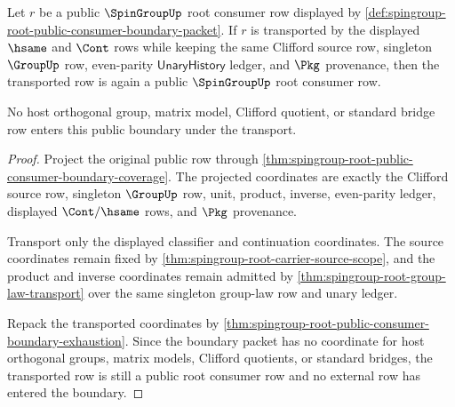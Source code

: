 \begin{theorem}
\label{thm:spingroup-root-public-boundary-transport-stability}
Let $r$ be a public $\SpinGroupUp$ root consumer row displayed by
\autoref{def:spingroup-root-public-consumer-boundary-packet}. If $r$ is
transported by the displayed $\hsame$ and $\Cont$ rows while keeping the same
Clifford source row, singleton $\GroupUp$ row, even-parity
$\mathsf{UnaryHistory}$ ledger, and $\Pkg$ provenance, then the transported
row is again a public $\SpinGroupUp$ root consumer row.

No host orthogonal group, matrix model, Clifford quotient, or standard bridge
row enters this public boundary under the transport.
\end{theorem}
\begin{proof}
Project the original public row through
\autoref{thm:spingroup-root-public-consumer-boundary-coverage}. The projected
coordinates are exactly the Clifford source row, singleton $\GroupUp$ row,
unit, product, inverse, even-parity ledger, displayed $\Cont/\hsame$ rows,
and $\Pkg$ provenance.

Transport only the displayed classifier and continuation coordinates. The
source coordinates remain fixed by
\autoref{thm:spingroup-root-carrier-source-scope}, and the product and
inverse coordinates remain admitted by
\autoref{thm:spingroup-root-group-law-transport} over the same singleton
group-law row and unary ledger.

Repack the transported coordinates by
\autoref{thm:spingroup-root-public-consumer-boundary-exhaustion}. Since the
boundary packet has no coordinate for host orthogonal groups, matrix models,
Clifford quotients, or standard bridges, the transported row is still a
public root consumer row and no external row has entered the boundary.
\end{proof}


